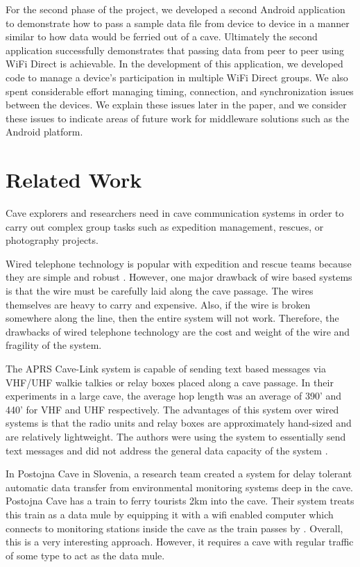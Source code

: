 \documentclass[10pt,twocolumn]{article}
\begin{document}
For the second phase of the project, we developed a second Android application to demonstrate how to pass a sample data file from device to device in a manner similar to how data would be ferried out of a cave.
Ultimately the second application successfully demonstrates that passing data from peer to peer using WiFi Direct is achievable. 
In the development of this application, we developed code to manage a device's participation in multiple WiFi Direct groups.
We also spent considerable effort managing timing, connection, and synchronization issues between the devices.
We explain these issues later in the paper, and we consider these issues to indicate areas of future work for middleware solutions
such as the Android platform.



\section{Related Work}
\label{sec:Related}
Cave explorers and researchers need in cave communication systems in order to carry out complex group tasks such as expedition management, rescues, or photography projects.

Wired telephone technology is popular with expedition and rescue teams because they are simple and robust \cite{cavecomm}.
However, one major drawback of wire based systems is that the wire must be carefully laid along the cave passage. 
The wires themselves are heavy to carry and expensive.
Also, if the wire is broken somewhere along the line, then the entire system will not work.
Therefore, the drawbacks of wired telephone technology are the cost and weight of the wire and fragility of the system.

The APRS Cave-Link system is capable of sending text based messages via VHF/UHF walkie talkies or relay boxes placed along a cave passage.
In their experiments in a large cave, the average hop length was an average of 390' and 440' for VHF and UHF respectively.
The advantages of this system over wired systems is that the radio units and relay boxes are approximately hand-sized and are relatively lightweight.
The authors were using the system to essentially send text messages and did not address the general data capacity of the system \cite{cavelink}.

In Postojna Cave in Slovenia, a research team created a system for delay tolerant automatic data transfer from environmental monitoring systems deep in the cave.
Postojna Cave has a train to ferry tourists 2km into the cave.
Their system treats this train as a data mule by equipping it with a wifi enabled computer which connects to monitoring stations inside the cave as the train passes by \cite{postojna2014}.
Overall, this is a very interesting approach. 
However, it requires a cave with regular traffic of some type to act as the data mule.
\end{document}

